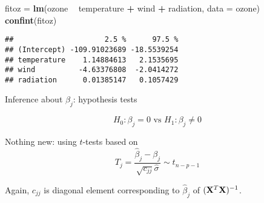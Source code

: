 \documentclass[ignorenonframetext,]{beamer}
\newenvironment{Shaded}{\begin{snugshade}}{\end{snugshade}}
\newcommand{\KeywordTok}[1]{\textcolor[rgb]{0.13,0.29,0.53}{\textbf{#1}}}
\newcommand{\DataTypeTok}[1]{\textcolor[rgb]{0.13,0.29,0.53}{#1}}
\newcommand{\StringTok}[1]{\textcolor[rgb]{0.31,0.60,0.02}{#1}}
\newcommand{\OperatorTok}[1]{\textcolor[rgb]{0.81,0.36,0.00}{\textbf{#1}}}
\newcommand{\NormalTok}[1]{#1}
\begin{document}
\begin{frame}[fragile]

\footnotesize

\begin{Shaded}
\begin{Highlighting}[]
\NormalTok{fitoz =}\StringTok{ }\KeywordTok{lm}\NormalTok{(ozone }\OperatorTok{~}\StringTok{ }\NormalTok{temperature }\OperatorTok{+}\StringTok{ }\NormalTok{wind }\OperatorTok{+}\StringTok{ }\NormalTok{radiation, }\DataTypeTok{data =}\NormalTok{ ozone)}
\KeywordTok{confint}\NormalTok{(fitoz)}
\end{Highlighting}
\end{Shaded}

\begin{verbatim}
##                     2.5 %      97.5 %
## (Intercept) -109.91023689 -18.5539254
## temperature    1.14884613   2.1535695
## wind          -4.63376808  -2.0414272
## radiation      0.01385147   0.1057429
\end{verbatim}

\normalsize

\end{frame}

\begin{frame}

\begin{block}{Inference about \(\beta_j\): hypothesis tests}

\[H_0: \beta_j=0 \text{ vs } H_1: \beta_j\neq 0\]

Nothing new: using \(t\)-tests based on
\[ T_j=\frac{\hat{\beta}_j-\beta_j}{\sqrt{c_{jj}}\hat{\sigma}}\sim t_{n-p-1}\]

Again, \(c_{jj}\) is diagonal element corresponding to \(\hat{\beta}_j\)
of \(({\bf X}^T{\bf X})^{-1}\).

\end{block}

\end{frame}
\end{document}
